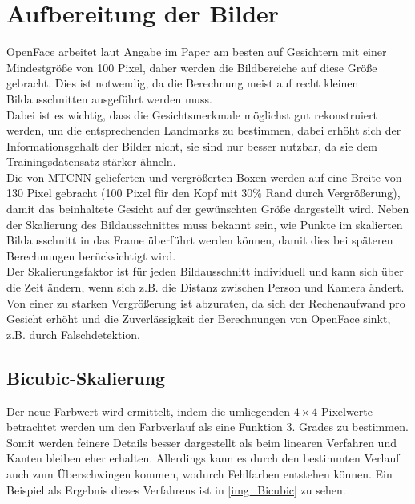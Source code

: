 \section{Aufbereitung der Bilder}
\label{scale_Algos}
OpenFace arbeitet laut Angabe im Paper \cite{OpenFace} am besten auf Gesichtern mit einer Mindestgröße von 100 Pixel, daher werden die Bildbereiche auf diese Größe gebracht. Dies ist notwendig, da die Berechnung meist auf recht kleinen Bildausschnitten ausgeführt werden muss.\\
Dabei ist es wichtig, dass die Gesichtsmerkmale möglichst gut rekonstruiert werden, um die entsprechenden Landmarks zu bestimmen, dabei erhöht sich der Informationsgehalt der Bilder nicht, sie sind nur besser nutzbar, da sie dem Trainingsdatensatz stärker ähneln.\\
Die von MTCNN gelieferten und vergrößerten Boxen werden auf eine Breite von 130 Pixel gebracht (100 Pixel für den Kopf mit $30\%$ Rand durch Vergrößerung), damit das beinhaltete Gesicht auf der gewünschten Größe dargestellt wird. Neben der Skalierung des Bildausschnittes muss bekannt sein, wie Punkte im skalierten Bildausschnitt in das Frame überführt werden können, damit dies bei späteren Berechnungen berücksichtigt wird.\\
Der Skalierungsfaktor ist für jeden Bildausschnitt individuell und kann sich über die Zeit ändern, wenn sich z.B. die Distanz zwischen Person und Kamera ändert. Von einer zu starken Vergrößerung ist abzuraten, da sich der Rechenaufwand pro Gesicht erhöht und die Zuverlässigkeit der Berechnungen von OpenFace sinkt, z.B. durch Falschdetektion.
\subsection{Bicubic-Skalierung}
Der neue Farbwert wird ermittelt, indem die umliegenden $4\times 4$ Pixelwerte betrachtet werden um den Farbverlauf als eine Funktion 3. Grades zu bestimmen. Somit werden feinere Details besser dargestellt als beim linearen Verfahren und Kanten bleiben eher erhalten. Allerdings kann es durch den bestimmten Verlauf auch zum Überschwingen kommen, wodurch Fehlfarben entstehen können. Ein Beispiel als Ergebnis dieses Verfahrens ist in \autoref{img_Bicubic} zu sehen.\\
\cite{wiki_Bicubic}
